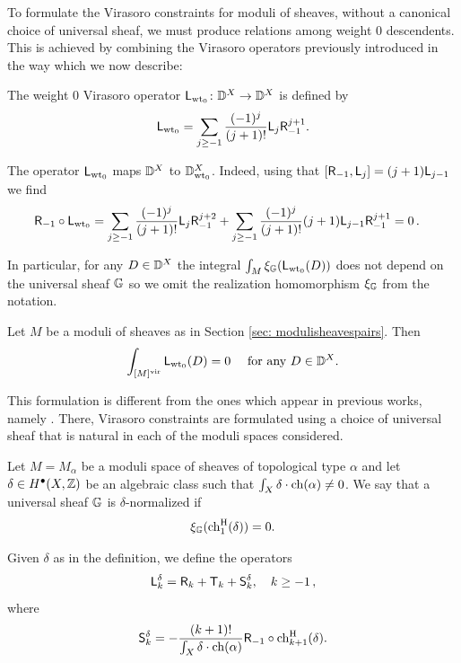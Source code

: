 \documentclass[a4paper, 12pt]{amsart}
\begin{document}
To formulate the Virasoro constraints for moduli of sheaves, without a canonical choice of universal sheaf, we must produce relations among weight 0 descendents. This is achieved by combining the Virasoro operators previously introduced in the way which we now describe:
\begin{definition}\label{def: Linv}
The weight 0 Virasoro operator $\mathsf{L}_{{\mathrm{wt}_0}} \colon {\mathbb{D}}^X\to {\mathbb{D}}^X$ is defined by
\[\mathsf{L}_{{\mathrm{wt}_0}}=\sum_{j\geq -1}\frac{(-1)^j}{(j+1)!}{\mathsf{L}}_j \mathsf{R}_{-1}^{j+1}.\]
\end{definition}

The operator $\mathsf{L}_{{\mathrm{wt}_0}}$ maps ${\mathbb{D}}^X$ to ${\mathbb{D}}^X_{{\mathrm{wt}_0}}$. Indeed, using that $[\mathsf{R}_{-1}, {\mathsf{L}}_j]=(j+1){\mathsf{L}}_{j-1}$ we find
\begin{align*}
    \mathsf{R}_{-1}\circ \mathsf{L}_{{\mathrm{wt}_0}} &=\sum_{j\geq -1}\frac{(-1)^j}{(j+1)!}{\mathsf{L}}_j \mathsf{R}_{-1}^{j+2}+\sum_{j\geq -1}\frac{(-1)^j}{(j+1)!}(j+1){\mathsf{L}}_{j-1} \mathsf{R}_{-1}^{j+1}=0\,.
\end{align*}

In particular, for any $D\in {\mathbb{D}}^X$ the integral $\int_M \xi_{{\mathbb{G}}}(\mathsf{L}_{{\mathrm{wt}_0}}(D))$ does not depend on the universal sheaf ${\mathbb{G}}$ so we omit the realization homomorphism $\xi_{{\mathbb{G}}}$ from the notation. 

\begin{conjecture}\label{conj: invVirasoro}
Let $M$ be a moduli of sheaves as in Section \ref{sec: modulisheavespairs}. Then
\[\int_{[M]^{\mathrm{vir}}} \mathsf{L}_{{\mathrm{wt}_0}}(D)=0\quad \textup{ for any }D\in {\mathbb{D}}^X.\]
\end{conjecture}

This formulation is different from the ones which appear in previous works, namely \cite{moop, moreira, bree}. There, Virasoro constraints are formulated using a choice of universal sheaf that is natural in each of the moduli spaces considered. 

\begin{definition}
Let $M=M_\alpha$ be a moduli space of sheaves of topological type $\alpha$ and let $\delta\in H^\bullet(X, {\mathbb{Z}})$ be an algebraic class such that $\int_X  \delta\cdot \mathrm{ch}(\alpha) \neq 0$. We say that a universal sheaf ${\mathbb{G}}$ is $\delta$-normalized if
\begin{equation}\label{Eq:deltanorm}\xi_{\mathbb{G}}(\mathrm{ch}^{\mathrm{H}}_1(\delta))=0.\end{equation}
\end{definition}

Given $\delta$ as in the definition, we define the operators
\[{\mathsf{L}}^\delta_k=\mathsf{R}_k+{\mathsf{T}}_k+{\mathsf{S}}_k^\delta,\quad k\geq -1\,,\]
where
\[{\mathsf{S}}_k^\delta=-\frac{(k+1)!}{\int_X \delta\cdot \mathrm{ch}(\alpha)}\mathsf{R}_{-1}\circ \mathrm{ch}^{\mathrm{H}}_{k+1}(\delta).\]
\end{document}
